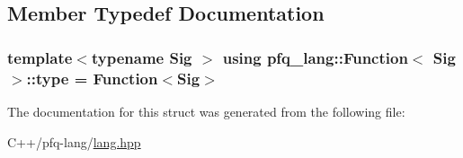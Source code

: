\subsection{Member Typedef Documentation}
\hypertarget{structpfq__lang_1_1Function_a084321c040f1cec047e0c6ae0c5ec8bd}{
\subsubsection[{type}]{\setlength{\rightskip}{0pt plus 5cm}template$<$typename Sig $>$ using {\bf pfq\+\_\+lang\+::\+Function}$<$ Sig $>$\+::{\bf type} =  {\bf Function}$<$Sig$>$}}\label{structpfq__lang_1_1Function_a084321c040f1cec047e0c6ae0c5ec8bd}


The documentation for this struct was generated from the following file\+:\begin{DoxyCompactItemize}
\item 
C++/pfq-\/lang/\hyperlink{lang_8hpp}{lang.\+hpp}\end{DoxyCompactItemize}
